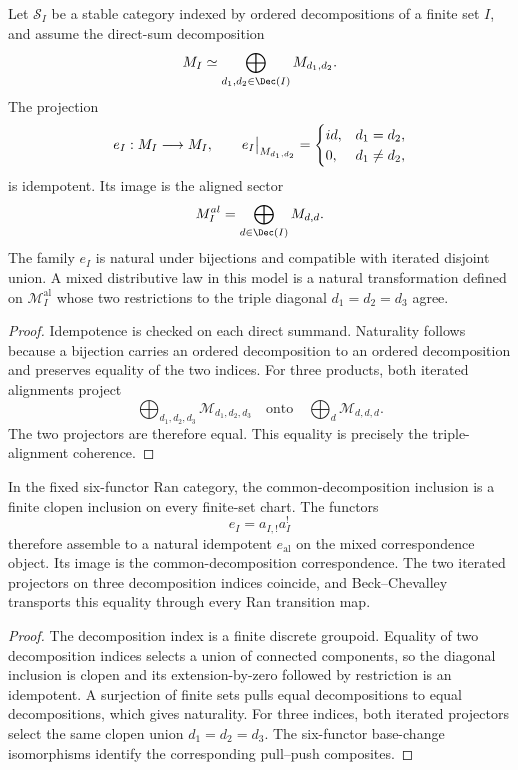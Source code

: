 \begin{theorem}
Let $\mathcal S_I$ be a stable category indexed by ordered decompositions of a finite set $I$, and assume the direct-sum decomposition
\[
 \mathcal M_I\simeq\bigoplus_{d_1,d_2\in\Dec(I)}\mathcal M_{d_1,d_2}.
\]
The projection
\[
 e_I:M_I\longrightarrow M_I,
 \qquad
 e_I\big|_{M_{d_1,d_2}}=
 \begin{cases}id,&d_1=d_2,\\0,&d_1\ne d_2,
 \end{cases}
\]
is idempotent.  Its image is the aligned sector
\[
 \mathcal M_I^{\mathrm{al}}
 =\bigoplus_{d\in\Dec(I)}\mathcal M_{d,d}.
\]
The family $e_I$ is natural under bijections and compatible with iterated disjoint union.  A mixed distributive law in this model is a natural transformation defined on $\mathcal M_I^{\mathrm{al}}$ whose two restrictions to the triple diagonal $d_1=d_2=d_3$ agree.
\end{theorem}
\begin{proof}
Idempotence is checked on each direct summand.  Naturality follows because a bijection carries an ordered decomposition to an ordered decomposition and preserves equality of the two indices.  For three products, both iterated alignments project
\[
 \bigoplus_{d_1,d_2,d_3}\mathcal M_{d_1,d_2,d_3}
 \quad\text{onto}\quad
 \bigoplus_d\mathcal M_{d,d,d}.
\]
The two projectors are therefore equal.  This equality is precisely the triple-alignment coherence.
\end{proof}

\begin{theorem}
In the fixed six-functor Ran category, the common-decomposition inclusion is a finite clopen inclusion on every finite-set chart.  The functors
\[
 e_I=a_{I,!}a_I^!
\]
therefore assemble to a natural idempotent $e_{\mathrm{al}}$ on the mixed correspondence object.  Its image is the common-decomposition correspondence.  The two iterated projectors on three decomposition indices coincide, and Beck--Chevalley transports this equality through every Ran transition map.
\end{theorem}
\begin{proof}
The decomposition index is a finite discrete groupoid.  Equality of two decomposition indices selects a union of connected components, so the diagonal inclusion is clopen and its extension-by-zero followed by restriction is an idempotent.  A surjection of finite sets pulls equal decompositions to equal decompositions, which gives naturality.  For three indices, both iterated projectors select the same clopen union $d_1=d_2=d_3$.  The six-functor base-change isomorphisms identify the corresponding pull--push composites.
\end{proof}

